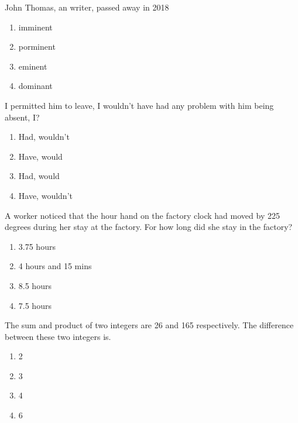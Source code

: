 \iffalse
\chapter{2019}
\author{AI24BTECH11028}
\section{me}
\fi

    \item John Thomas, an \underline{\hspace{2cm}} writer, passed away in 2018
    \begin{enumerate}
        \item imminent
        \item porminent
        \item eminent
        \item dominant
    \end{enumerate}

    \item \underline{\hspace{2cm}} I permitted him to leave, I wouldn't have had any problem with him being absent,\underline{\hspace{2cm}} I?
    \begin{enumerate}
        \item Had, wouldn't
        \item Have, would
        \item Had, would
        \item Have, wouldn't
    \end{enumerate}

    \item A worker noticed that the hour hand on the factory clock had moved by 225 degrees during her stay at the factory. For how long did she stay in the factory?
    \begin{enumerate}
        \item 3.75 hours
        \item 4 hours and 15 mins
        \item 8.5 hours
        \item 7.5 hours
    \end{enumerate}

    \item The sum and product of two integers are 26 and 165 respectively. The difference between these two integers is\underline{\hspace{2cm}}.
    \begin{enumerate}
        \item 2
        \item 3
        \item 4
        \item 6
    \end{enumerate}

